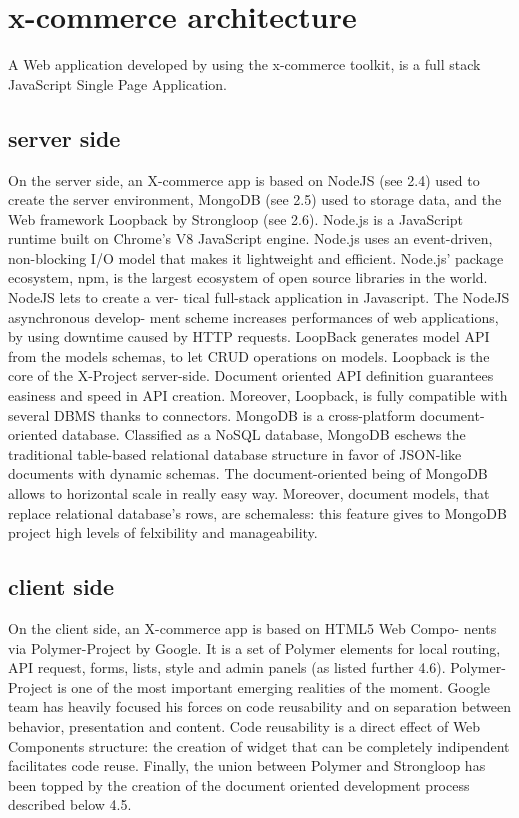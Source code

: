 \section{x-commerce architecture}
\label{sec:x_commerce_architecture}
A Web application developed by using the x-commerce toolkit, is a full stack JavaScript Single Page Application.
\subsection{server side}
On the server side, an X-commerce app is based on NodeJS (see 2.4) used to create the server environment, MongoDB (see 2.5) used to storage data, and the Web framework Loopback by Strongloop (see 2.6).
\newline
Node.js is a JavaScript runtime built on Chrome’s V8 JavaScript engine. Node.js uses an event-driven, non-blocking I/O model that makes it lightweight and efficient. Node.js’ package ecosystem, npm, is the largest ecosystem of open source libraries in the world. NodeJS lets to create a ver- tical full-stack application in Javascript. The NodeJS asynchronous develop- ment scheme increases performances of web applications, by using downtime caused by HTTP requests.
\newline
LoopBack generates model API from the models schemas, to let CRUD operations on models. Loopback is the core of the X-Project server-side. Document oriented API definition guarantees easiness and speed in API creation. Moreover, Loopback, is fully compatible with several DBMS thanks to connectors.
\newline
MongoDB is a cross-platform document-oriented database. Classified as a NoSQL database, MongoDB eschews the traditional table-based relational database structure in favor of JSON-like documents with dynamic schemas. The document-oriented being of MongoDB allows to horizontal scale in really easy way. Moreover, document models, that replace relational database’s rows, are schemaless: this feature gives to MongoDB project high levels of felxibility and manageability.
\subsection{client side}
On the client side, an X-commerce app is based on HTML5 Web Compo- nents via Polymer-Project by Google. It is a set of Polymer elements for local routing, API request, forms, lists, style and admin panels (as listed further 4.6).
\newline
Polymer-Project is one of the most important emerging realities of the moment. Google team has heavily focused his forces on code reusability and on separation between behavior, presentation and content. Code reusability is a direct effect of Web Components structure: the creation of widget that can be completely indipendent facilitates code reuse.
Finally, the union between Polymer and Strongloop has been topped by the creation of the document oriented development process described below 4.5.



